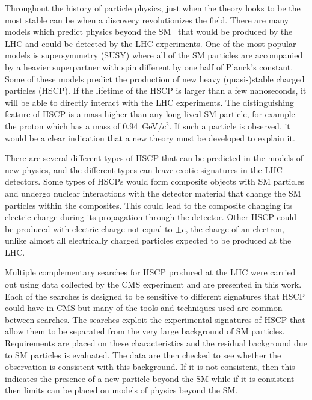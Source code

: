 Throughout the history of particle physics, just when the theory looks to be the most stable can be when a discovery revolutionizes the field.
There are many models which predict physics beyond the SM~\cite{Martin:1997ns, Tata:1997uf} 
that would be produced by the LHC and could be detected by the LHC experiments.
One of the most popular models is supersymmetry (SUSY) where all of the SM particles are accompanied by a heavier superpartner with spin different by one half
of Planck's constant.
Some of these models predict the production of new heavy (quasi-)stable charged particles (HSCP). 
If the lifetime of the HSCP is larger than a few nanoseconds, it will be able to directly interact with the LHC experiments.
The distinguishing feature of HSCP is a mass higher than any long-lived SM particle, for example the proton which has a mass of 0.94~GeV/$c^2$.
If such a particle is observed, it would be a clear indication that a new theory must be developed to explain it.

There are several different types of HSCP that can be predicted in the models of new physics, and the different types can leave exotic signatures in the LHC detectors.
Some types of HSCPs would form composite objects with SM particles and undergo nuclear interactions with the detector material
that change the SM particles within the composites. This could lead to the composite changing its electric charge during its propagation through the detector.
Other HSCP could be produced with electric charge not equal to $\pm e$, the charge of an electron, unlike almost all electrically charged particles 
expected to be produced at the LHC.

Multiple complementary searches for HSCP produced at the LHC were carried out using data collected by the CMS experiment and are presented in this work.
Each of the searches is designed to be sensitive to different signatures that HSCP could have in CMS but many of the tools and techniques used are
common between searches. The searches exploit the experimental signatures of HSCP that allow them to be separated from the very large background of SM particles.
Requirements are placed on these characteristics and the residual background due to SM particles is evaluated. The data are then checked to see whether
the observation is consistent with this background. If it is not consistent, then this indicates the presence of a new particle beyond the SM while if it
is consistent then limits can be placed on models of physics beyond the SM.

